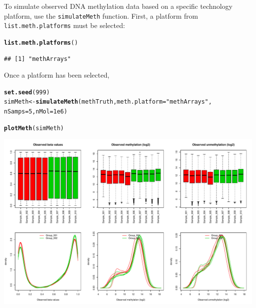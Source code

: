\documentclass{article}\usepackage[]{graphicx}\usepackage[usenames,dvipsnames]{color}
\makeatletter
\def\maxwidth{ %
  \ifdim\Gin@nat@width>\linewidth
    \linewidth
  \else
    \Gin@nat@width
  \fi
}
\newcommand{\hlnum}[1]{\textcolor[rgb]{0.686,0.059,0.569}{#1}}%
\newcommand{\hlstr}[1]{\textcolor[rgb]{0.192,0.494,0.8}{#1}}%
\newcommand{\hlstd}[1]{\textcolor[rgb]{0.345,0.345,0.345}{#1}}%
\newcommand{\hlkwb}[1]{\textcolor[rgb]{0.69,0.353,0.396}{#1}}%
\newcommand{\hlkwc}[1]{\textcolor[rgb]{0.333,0.667,0.333}{#1}}%
\newcommand{\hlkwd}[1]{\textcolor[rgb]{0.737,0.353,0.396}{\textbf{#1}}}%
\newenvironment{kframe}{%
 \def\at@end@of@kframe{}%
 \ifinner\ifhmode%
  \def\at@end@of@kframe{\end{minipage}}%
  \begin{minipage}{\columnwidth}%
 \fi\fi%
 \def\FrameCommand##1{\hskip\@totalleftmargin \hskip-\fboxsep
 \colorbox{shadecolor}{##1}\hskip-\fboxsep
     \hskip-\linewidth \hskip-\@totalleftmargin \hskip\columnwidth}%
 \MakeFramed {\advance\hsize-\width
   \@totalleftmargin\z@ \linewidth\hsize
   \@setminipage}}%
 {\par\unskip\endMakeFramed%
 \at@end@of@kframe}
\newenvironment{knitrout}{}{} %
\makeatother
\begin{document}
To simulate observed DNA methylation data based on a specific technology 
platform, use the \texttt{simulateMeth} function. First, a platform from 
\texttt{list.meth.platforms} must be selected:
\begin{knitrout}
\color{fgcolor}\begin{kframe}
\begin{alltt}
\hlkwd{list.meth.platforms}\hlstd{()}
\end{alltt}
\begin{verbatim}
## [1] "methArrays"
\end{verbatim}
\end{kframe}
\end{knitrout}

Once a platform has been selected, 
\begin{knitrout}
\color{fgcolor}\begin{kframe}
\begin{alltt}
\hlkwd{set.seed}\hlstd{(}\hlnum{999}\hlstd{)}
\hlstd{simMeth} \hlkwb{<-} \hlkwd{simulateMeth}\hlstd{(methTruth,}  \hlkwc{meth.platform} \hlstd{=} \hlstr{"methArrays"}\hlstd{,}
                        \hlkwc{nSamps} \hlstd{=} \hlnum{5}\hlstd{,} \hlkwc{nMol} \hlstd{=} \hlnum{1e6}\hlstd{)}
\end{alltt}


{\ttfamily\noindent\itshape\color{messagecolor}{\#\# Simulating DNA methylation samples using the meth.platform: methArrays}}\begin{alltt}
\hlkwd{plotMeth}\hlstd{(simMeth)}
\end{alltt}
\end{kframe}
\includegraphics[width=\maxwidth]{figure/meth-figs-1} 

\end{knitrout}
\end{document}
